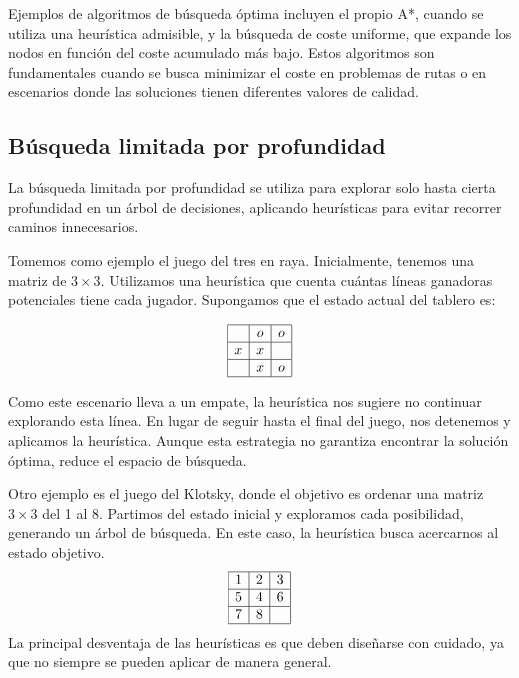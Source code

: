 Ejemplos de algoritmos de búsqueda óptima incluyen el propio A*, cuando se utiliza una heurística admisible, y la búsqueda de coste uniforme, que expande los nodos en función del coste acumulado más bajo. Estos algoritmos son fundamentales cuando se busca minimizar el coste en problemas de rutas o en escenarios donde las soluciones tienen diferentes valores de calidad.


\subsection{Búsqueda limitada por profundidad}

La búsqueda limitada por profundidad se utiliza para explorar solo hasta cierta profundidad en un árbol de decisiones, aplicando heurísticas para evitar recorrer caminos innecesarios.

Tomemos como ejemplo el juego del tres en raya. Inicialmente, tenemos una matriz de $3\times3$. Utilizamos una heurística que cuenta cuántas líneas ganadoras potenciales tiene cada jugador. Supongamos que el estado actual del tablero es:

$$
	\begin{array}{|c|c|c|}
		\hline
		  & o & o \\
		\hline
		x & x &   \\
		\hline
		  & x & o \\
		\hline
	\end{array}
$$

Como este escenario lleva a un empate, la heurística nos sugiere no continuar explorando esta línea. En lugar de seguir hasta el final del juego, nos detenemos y aplicamos la heurística. Aunque esta estrategia no garantiza encontrar la solución óptima, reduce el espacio de búsqueda.

Otro ejemplo es el juego del Klotsky, donde el objetivo es ordenar una matriz $3\times3$ del 1 al 8. Partimos del estado inicial y exploramos cada posibilidad, generando un árbol de búsqueda. En este caso, la heurística busca acercarnos al estado objetivo.
$$
	\begin{array}{|c|c|c|}
		\hline
		1 & 2 & 3 \\
		\hline
		5 & 4 & 6 \\
		\hline
		7 & 8 &   \\
		\hline
	\end{array}
$$
La principal desventaja de las heurísticas es que deben diseñarse con cuidado, ya que no siempre se pueden aplicar de manera general.

